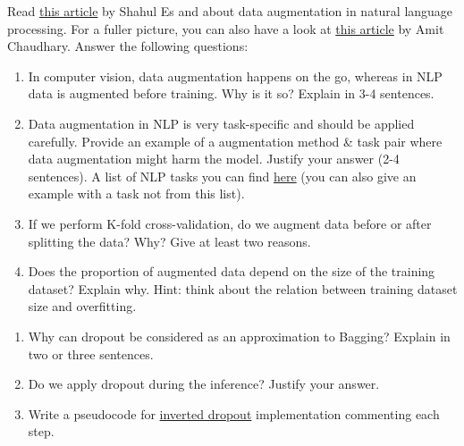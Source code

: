 \begin{exercise}

Read \href{https://neptune.ai/blog/data-augmentation-nlp}{this article} by Shahul Es and  about data augmentation in natural language processing. For a fuller picture, you can also have a look at \href{https://amitness.com/2020/05/data-augmentation-for-nlp/}{this article} by Amit Chaudhary. Answer the following questions:

\begin{enumerate}

	\item In computer vision, data augmentation happens on the go, whereas in NLP data is augmented before training.
	Why is it so? Explain in 3-4 sentences.
	\item Data augmentation in NLP is very task-specific and should be applied carefully. 
	Provide an example of a augmentation method \& task pair where data augmentation might harm the model. Justify your answer (2-4 sentences).
	A list of NLP tasks you can find \href{https://natural-language-understanding.fandom.com/wiki/List_of_natural_language_processing_tasks}{here} (you can also give an example with a task not from this list).
	\item If we perform K-fold cross-validation, do we augment data before or after splitting the data? Why? Give at least two reasons.
	\item Does the proportion of augmented data depend on the size of the training dataset? Explain why. Hint: think about the relation between training dataset size and overfitting.        

\end{enumerate}

\end{exercise}


\begin{solution}
   

\end{solution}


\begin{exercise}
\end{exercise}


\begin{enumerate}
	\item Why can dropout be considered as an approximation to Bagging? Explain in two or
three sentences.
	\item Do we apply dropout during the inference? Justify your answer.
	\item Write a pseudocode for \href{https://cutt.ly/tjfq78f}{inverted dropout} implementation commenting each step.

\end{enumerate}

